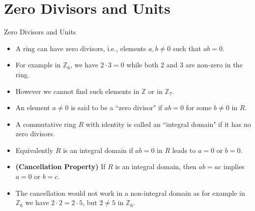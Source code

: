 \documentclass[ %
 10pt, xcolor={dvipsnames,svgnames,x11names,hyperref},
   hyperref={colorlinks=true,citecolor=green,linkcolor=DarkRed,urlcolor=ProcessBlue,anchorcolor=blue}
  ]{beamer}
\newenvironment{stepitemize}{\begin{itemize}[<+->]}{\end{itemize} }
\newcommand{\Z}{\mathbb{Z}}
\begin{document}
\section{Zero Divisors and Units}
\begin{frame}{Zero Divisors and Units}
    \begin{stepitemize}
    \item A ring can have zero divisors, i.e., elements $a,b \neq 0$ such that $ab=0$.
    \item For example in $\Z_6$, we have $2\cdot 3=0$ while both $2$ and $3$ are non-zero in the ring.
    \item However we cannot find such elements in $\Z$ or in $\Z_7$.
    \item  An element $a\neq 0$ is said to be a ``zero divisor" if $ab=0$ for some $b\neq 0$ in $R$.
    \item
    A commutative ring $R$ with identity is called an ``integral domain" if it has no zero divisors.
    \item Equivalently $R$ is an integral domain if $ab=0$ in $R$ leads to $a=0$ or $b=0$.
    \item {\bf (Cancellation Property)} If $R$ is an integral domain, then $ab=ac$ implies $a=0$ or $b=c$.
    \item The cancellation would not work in a non-integral domain as for example in $\Z_6$ we have $2\cdot 2=2\cdot 5$, but $2\neq 5$ in $\Z_6$.
    \end{stepitemize}
\end{frame}
\end{document}
